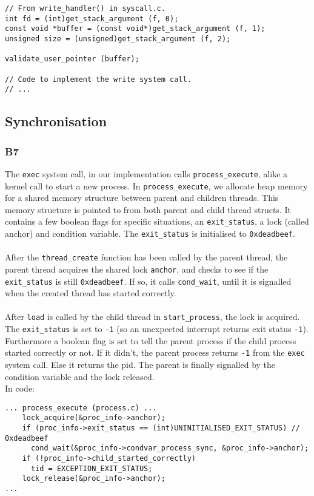 \documentclass[a4wide, 11pt]{article}
\newcommand{\tx}{\texttt}
\begin{document}
\begin{verbatim}
// From write_handler() in syscall.c.
int fd = (int)get_stack_argument (f, 0);
const void *buffer = (const void*)get_stack_argument (f, 1);
unsigned size = (unsigned)get_stack_argument (f, 2);

validate_user_pointer (buffer);

// Code to implement the write system call.
// ...
\end{verbatim}

\subsection{Synchronisation}
\subsubsection{B7}

The \tx{exec} system call, in our implementation calls \tx{process\_execute}, alike a kernel call to start a new process. In \tx{process\_execute}, we allocate heap memory for a shared memory structure between parent and children threads. This memory structure is pointed to from both parent and child thread structs. It contains a few boolean flags for specific situations, an \tx{exit\_status}, a lock (called anchor) and condition variable. The \tx{exit\_status} is initialised to \tx{0xdeadbeef}.
\\\\
After the \tx{thread\_create} function has been called by the parent thread, the parent thread acquires the shared lock \tx{anchor}, and checks to see if the \tx{exit\_status} is still \tx{0xdeadbeef}. If so, it calls \tx{cond\_wait}, until it is signalled when the created thread has started correctly.
\\\\
After \texttt{load} is called by the child thread in \tx{start\_process}, the lock is acquired. The \tx{exit\_status} is set to \tx{-1} (so an unexpected interrupt returns exit status \tx{-1}). Furthermore a boolean flag is set to tell the parent process if the child process started correctly or not. If it didn't, the parent process returns \tx{-1} from the \texttt{exec} system call. Else it returns the pid. The parent is finally signalled by the condition variable and the lock released.
\\
In code:

\begin{verbatim}
... process_execute (process.c) ...
    lock_acquire(&proc_info->anchor);
    if (proc_info->exit_status == (int)UNINITIALISED_EXIT_STATUS) // 0xdeadbeef
      cond_wait(&proc_info->condvar_process_sync, &proc_info->anchor);
    if (!proc_info->child_started_correctly)
      tid = EXCEPTION_EXIT_STATUS;
    lock_release(&proc_info->anchor);
...
\end{verbatim}
\end{document}

